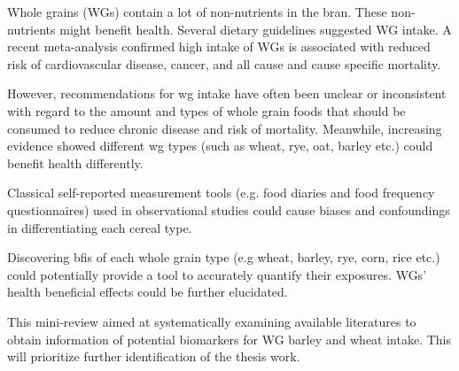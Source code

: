Whole grains (WGs) contain a lot of non-nutrients in the bran. 
These non-nutrients might benefit health. Several dietary guidelines suggested WG intake\cite{Piepoli2016}. A recent meta-analysis confirmed high intake of WGs is associated with reduced risk of cardiovascular disease, cancer, and all cause and cause specific mortality\cite{Aune2016}. 

However, recommendations for \acrshort{wg} intake have often been unclear or inconsistent with regard to the amount and types of whole grain foods that should be consumed to reduce chronic disease and risk of mortality\cite{Aune2016}. Meanwhile, increasing evidence showed different \acrshort{wg} types (such as wheat, rye, oat, barley etc.) could benefit health differently. 

Classical self-reported measurement tools (e.g. food diaries and food frequency questionnaires) used in observational studies could cause biases and confoundings in differentiating each cereal type.
 

Discovering \acrshort{bfis} of each whole grain type (e.g wheat, barley, rye, corn, rice etc.) could potentially provide a tool to accurately quantify their exposures. WGs' health beneficial effects could be further elucidated. 

This mini-review aimed at systematically examining available literatures to obtain information of potential biomarkers for WG barley and wheat intake. This will prioritize further identification of the thesis work.